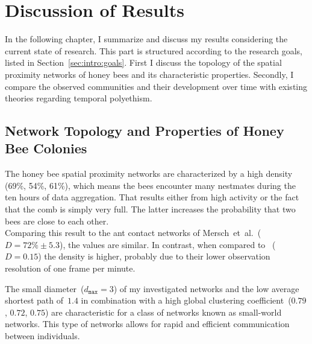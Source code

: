 \section{Discussion of Results}

In the following chapter, I summarize and discuss my results considering the current state of research.
This part is structured according to the research goals, listed in Section~\ref{sec:intro:goals}.
First I discuss the topology of the spatial proximity networks of honey bees and its characteristic properties.
Secondly, I compare the observed communities and their development over time with existing theories regarding temporal polyethism.


\subsection{Network Topology and Properties of Honey Bee Colonies}
The honey bee spatial proximity networks are characterized by a high density (69\%, 54\%, 61\%), which means the bees encounter many nestmates during the ten hours of data aggregation.
That results either from high activity or the fact that the comb is simply very full.
The latter increases the probability that two bees are close to each other.\\
Comparing this result to the ant contact networks of Mersch~et~al.\cite{mersch2013tracking}~($D=72\%\pm5.3$), the values are similar.
In contrast, when compared to \textcite{baracchi2014socio}~($D=0.15$) the density is higher, probably due to their lower observation resolution of one frame per minute.


The small diameter~($d_{\texttt{max}}=3$) of my investigated networks and the low average shortest path of~$1.4$ in combination with a high global clustering coefficient~($0.79$, $0.72$, $0.75$) are characteristic for a class of networks known as small-world networks.
This type of networks allows for rapid and efficient communication between individuals.


